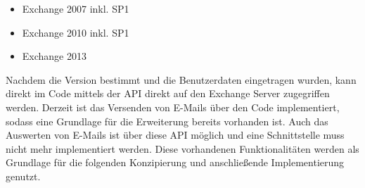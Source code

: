 \begin{itemize}[topsep=-0.5\parskip]
\item Exchange 2007 inkl. SP1
\item  Exchange 2010 inkl. SP1
\item  Exchange 2013 
\end{itemize}

\noindent
Nachdem die Version bestimmt und die Benutzerdaten eingetragen wurden, kann direkt im Code mittels der API direkt auf den Exchange Server zugegriffen werden. Derzeit ist das Versenden von E-Mails über den Code implementiert, sodass eine Grundlage für die Erweiterung bereits vorhanden ist. Auch das Auswerten von E-Mails ist über diese API möglich und eine Schnittstelle muss nicht mehr implementiert werden. Diese vorhandenen Funktionalitäten werden als Grundlage für die folgenden Konzipierung und anschließende Implementierung genutzt. 

